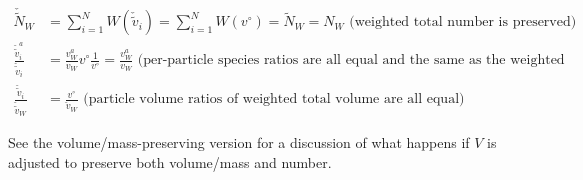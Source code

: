 \documentclass{article}
\begin{document}
\begin{align*}
  \check{\tilde{N}}_W &= \sum_{i=1}^N W(\check{\tilde{v}}_i) = \sum_{i=1}^N W(v^{\circ}) = \tilde{N}_W = N_W \text{ (weighted total number is preserved)} \\
  \frac{\check{\tilde{v}}_i^a}{\check{\tilde{v}}_i} &= \frac{v_W^a}{v_W} v^{\circ} \frac{1}{v^{\circ}} = \frac{v_W^a}{v_W} \text{ (per-particle species ratios are all equal and the same as the weighted total species ratios)} \\
  \frac{\check{\tilde{v}}_i}{\check{\tilde{v}}_W} &= \frac{v^{\circ}}{\check{v}_W} \text{ (particle volume ratios of weighted total volume are all equal)}
\end{align*}

See the volume/mass-preserving version for a discussion of what
happens if $V$ is adjusted to preserve both volume/mass and number.
\end{document}
